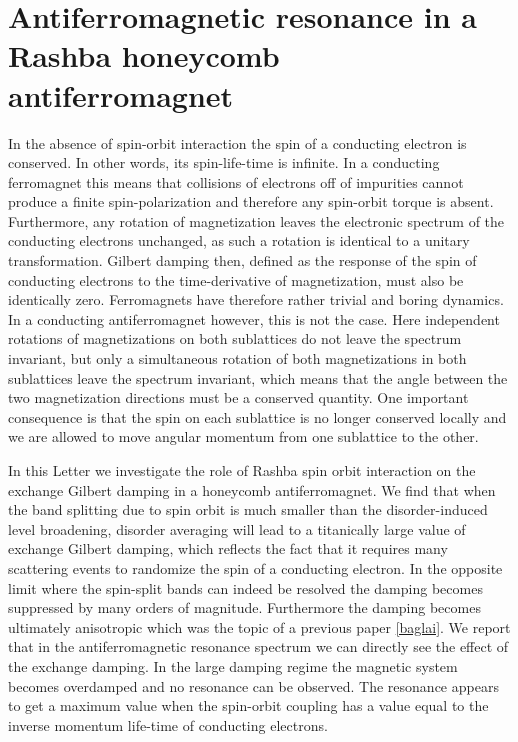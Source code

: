 \chapter{Antiferromagnetic resonance in a Rashba honeycomb antiferromagnet} %
In the absence of spin-orbit interaction the spin of a conducting electron is conserved. In other words, its spin-life-time is infinite. In a conducting ferromagnet this means that collisions of electrons off of impurities cannot produce a finite spin-polarization and therefore any spin-orbit torque is absent. Furthermore, any rotation of magnetization leaves the electronic spectrum of the conducting electrons unchanged, as such a rotation is identical to a unitary transformation. Gilbert damping then, defined as the response of the spin of conducting electrons to the time-derivative of magnetization, must also be identically zero. Ferromagnets have therefore rather trivial and boring dynamics. In a conducting antiferromagnet however, this is not the case. Here independent rotations of magnetizations on both sublattices do not leave the spectrum invariant, but only a simultaneous rotation of both magnetizations in both sublattices leave the spectrum invariant, which means that the angle between the two magnetization directions must be a conserved quantity. One important consequence is that the spin on each sublattice is no longer conserved locally and we are allowed to move angular momentum from one sublattice to the other.  

In this Letter we investigate the role of Rashba spin orbit interaction on the exchange Gilbert damping in a honeycomb antiferromagnet. We find that when the band splitting due to spin orbit is much smaller than the disorder-induced level broadening, disorder averaging will lead to a titanically large value of exchange Gilbert damping, which reflects the fact that it requires many scattering events to randomize the spin of a conducting electron. In the opposite limit where the spin-split bands can indeed be resolved the damping becomes suppressed by many orders of magnitude. Furthermore the damping becomes ultimately anisotropic which was the topic of a previous paper \ref{baglai}. We report that in the antiferromagnetic resonance spectrum we can directly see the effect of the exchange damping. In the large damping regime the magnetic system becomes overdamped and no resonance can be observed. The resonance appears to get a maximum value when the spin-orbit coupling has a value equal to the inverse momentum life-time of conducting electrons. 

